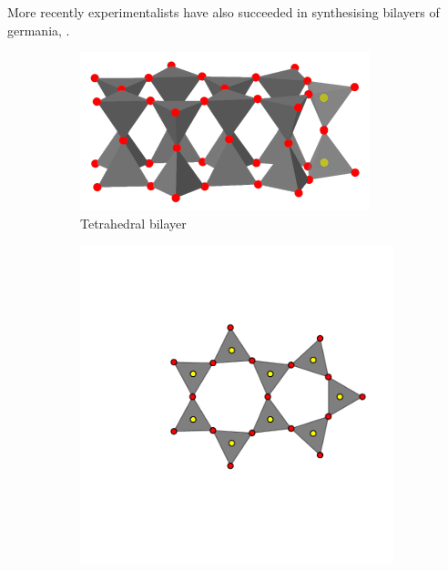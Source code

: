 More recently experimentalists have also succeeded in synthesising bilayers of germania, \geoii{} \cite{Lewandowski2018,Lewandowski2019}.

\begin{figure}[bt]
     \centering
     
     \begin{subfigure}[b]{0.3\textwidth}
         \centering
         \includegraphics[width=\textwidth]{./figures/bilayers/mx2_bilayer_1.pdf}
         \vspace{-1mm}
         \caption{Tetrahedral bilayer}
         \label{fig:bilayer1}
     \end{subfigure}
     \hfill
	\begin{subfigure}[b]{0.3\textwidth}
         \centering
         \includegraphics[width=\textwidth]{./figures/bilayers/mx2_bilayer_2.pdf}

\end{subfigure}
\end{figure}
